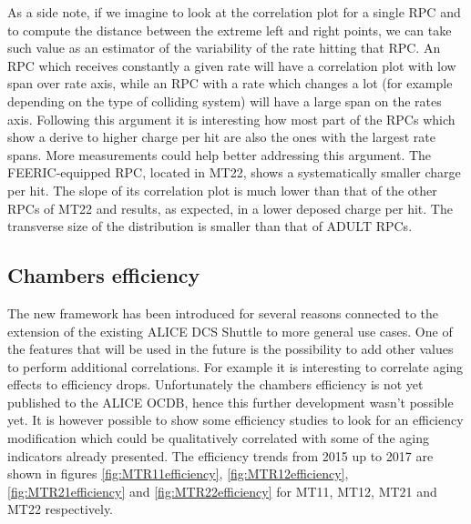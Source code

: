 As a side note, if we imagine to look at the correlation plot for a single RPC and to compute the distance between the extreme left and right points, we can take such value as an estimator of the variability of the rate hitting that RPC.
An RPC which receives constantly a given rate will have a correlation plot with low span over rate axis, while an RPC with a rate which changes a lot (for example depending on the type of colliding system) will have a large span on the rates axis.
Following this argument it is interesting how most part of the RPCs which show a derive to higher charge per hit are also the ones with the largest rate spans.
More measurements could help better addressing this argument.
The FEERIC-equipped RPC, located in MT22, shows a systematically smaller charge per hit.
The slope of its correlation plot is much lower than that of the other RPCs of MT22 and results, as expected, in a lower deposed charge per hit.
The transverse size of the distribution is smaller than that of ADULT RPCs.

\subsection{Chambers efficiency}
The new framework has been introduced for several reasons connected to the extension of the existing ALICE DCS Shuttle to more general use cases.
One of the features that will be used in the future is the possibility to add other values to perform additional correlations.
For example it is interesting to correlate aging effects to efficiency drops.
Unfortunately the chambers efficiency is not yet published to the ALICE OCDB, hence this further development wasn't possible yet.
It is however possible to show some efficiency studies to look for an efficiency modification which could be qualitatively correlated with some of the aging indicators already presented.
The efficiency trends from 2015 up to 2017 are shown in figures \ref{fig:MTR11efficiency}, \ref{fig:MTR12efficiency}, \ref{fig:MTR21efficiency} and \ref{fig:MTR22efficiency} for MT11, MT12, MT21 and MT22 respectively.

